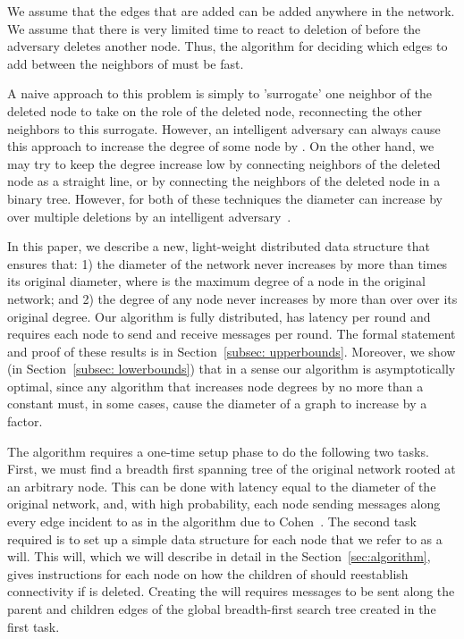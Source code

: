 \documentclass[11pt]{article}
\begin{document}
We assume that the edges that are added can be added anywhere in the
network.  We assume that there is very limited time to react to
deletion of  before the adversary deletes another node.  Thus, the
algorithm for deciding which edges to add between the neighbors of 
must be fast.

\medskip
{}  A naive approach to this problem is
simply to 'surrogate' one neighbor of the deleted node to take on the
role of the deleted node, reconnecting the other neighbors to this
surrogate. However, an intelligent adversary can always cause this approach to 
increase the degree of some node by . On the other hand, we may try to keep the degree
increase low by connecting neighbors of the deleted node as a straight
line, or by connecting the neighbors of the deleted node in a binary tree.  However, for both of these techniques the diameter can increase by  over multiple deletions by an intelligent adversary~\cite{BomanSAS06, SaiaTrehanIPDPS08}.

In this paper, we describe a new, light-weight distributed data structure that ensures that: 1) the diameter of the network never increases by more than  times its original diameter, where  is the
maximum degree of a node in the original network; and 2) the degree of
any node never increases by more than  over over its original
degree.  Our algorithm is fully distributed, has  latency per
round and requires each node to send and receive  messages per
round.   The formal statement and proof of these results is in Section~\ref{subsec: upperbounds}.  Moreover, we show (in Section~\ref{subsec:
lowerbounds}) that
in a sense our algorithm is asymptotically optimal, since any algorithm that increases node degrees by no more than a
constant must, in some cases, cause the diameter of a graph to increase by a  factor.

The algorithm requires a one-time setup phase  to do the
following two tasks.  First, we must find a breadth first spanning
tree of the original network rooted at an arbitrary node.  This can be
done with latency equal to the diameter of the original network, and,
with high probability, each node  sending  messages
along every edge incident to  as in the algorithm due to
Cohen~\cite{Cohen}. The second task required is to set up a simple
data structure for each node that we refer to as a will.  This will,
which we will describe in detail in the Section~\ref{sec:algorithm}, gives
instructions for each node  on how the children of  should
reestablish connectivity if  is deleted.  Creating the will
requires  messages to be sent along the parent and children
edges of the global breadth-first search tree created in the first
task.
 
\end{document}
